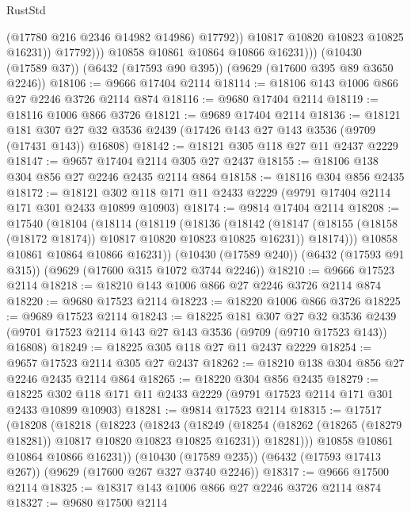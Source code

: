 \begin{lexlean}{RustStd}
\begin{coremodule}
                        (@17780 @216 @2346 @14982 @14986)
                        @17792))
                    @10817
                    @10820
                    @10823
                    @10825
                    @16231))
                @17792)))
          @10858
          @10861
          @10864
          @10866
          @16231)))
    (@10430 (@17589 @37))
    (@6432 (@17593 @90 @395))
    (@9629 (@17600 @395 @89 @3650 @2246))
@18106 := @9666 @17404 @2114
@18114 := @18106 @143 @1006 @866 @27 @2246 @3726 @2114 @874
@18116 := @9680 @17404 @2114
@18119 := @18116 @1006 @866 @3726
@18121 := @9689 @17404 @2114
@18136 := @18121
    @181
    @307
    @27
    @32
    @3536
    @2439
    (@17426 @143 @27 @143 @3536 (@9709 (@17431 @143)) @16808)
@18142 := @18121 @305 @118 @27 @11 @2437 @2229
@18147 := @9657 @17404 @2114 @305 @27 @2437
@18155 := @18106 @138 @304 @856 @27 @2246 @2435 @2114 @864
@18158 := @18116 @304 @856 @2435
@18172 := @18121 @302 @118 @171 @11 @2433 @2229 (@9791 @17404 @2114 @171 @301 @2433 @10899 @10903)
@18174 := @9814 @17404 @2114
@18208 := @17540
    (@18104
      (@18114
        (@18119
          (@18136
            (@18142
              (@18147 (@18155 (@18158 (@18172 @18174)) @10817 @10820 @10823 @10825 @16231))
              @18174)))
        @10858
        @10861
        @10864
        @10866
        @16231))
    (@10430 (@17589 @240))
    (@6432 (@17593 @91 @315))
    (@9629 (@17600 @315 @1072 @3744 @2246))
@18210 := @9666 @17523 @2114
@18218 := @18210 @143 @1006 @866 @27 @2246 @3726 @2114 @874
@18220 := @9680 @17523 @2114
@18223 := @18220 @1006 @866 @3726
@18225 := @9689 @17523 @2114
@18243 := @18225
    @181
    @307
    @27
    @32
    @3536
    @2439
    (@9701 @17523 @2114 @143 @27 @143 @3536 (@9709 (@9710 @17523 @143)) @16808)
@18249 := @18225 @305 @118 @27 @11 @2437 @2229
@18254 := @9657 @17523 @2114 @305 @27 @2437
@18262 := @18210 @138 @304 @856 @27 @2246 @2435 @2114 @864
@18265 := @18220 @304 @856 @2435
@18279 := @18225 @302 @118 @171 @11 @2433 @2229 (@9791 @17523 @2114 @171 @301 @2433 @10899 @10903)
@18281 := @9814 @17523 @2114
@18315 := @17517
    (@18208
      (@18218
        (@18223
          (@18243
            (@18249
              (@18254 (@18262 (@18265 (@18279 @18281)) @10817 @10820 @10823 @10825 @16231))
              @18281)))
        @10858
        @10861
        @10864
        @10866
        @16231))
    (@10430 (@17589 @235))
    (@6432 (@17593 @17413 @267))
    (@9629 (@17600 @267 @327 @3740 @2246))
@18317 := @9666 @17500 @2114
@18325 := @18317 @143 @1006 @866 @27 @2246 @3726 @2114 @874
@18327 := @9680 @17500 @2114

\end{coremodule}
\end{lexlean}
